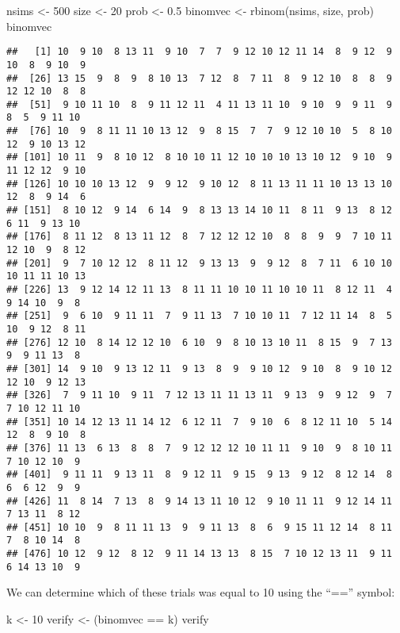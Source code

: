\documentclass[
]{book}
\newenvironment{Shaded}{\begin{snugshade}}{\end{snugshade}}
\newcommand{\DecValTok}[1]{\textcolor[rgb]{0.00,0.00,0.81}{#1}}
\newcommand{\FloatTok}[1]{\textcolor[rgb]{0.00,0.00,0.81}{#1}}
\newcommand{\FunctionTok}[1]{\textcolor[rgb]{0.00,0.00,0.00}{#1}}
\newcommand{\NormalTok}[1]{#1}
\newcommand{\OtherTok}[1]{\textcolor[rgb]{0.56,0.35,0.01}{#1}}
\newcommand{\SpecialCharTok}[1]{\textcolor[rgb]{0.00,0.00,0.00}{#1}}
\begin{document}
\begin{Shaded}
\begin{Highlighting}[]
\NormalTok{nsims }\OtherTok{\textless{}{-}} \DecValTok{500}
\NormalTok{size }\OtherTok{\textless{}{-}} \DecValTok{20}
\NormalTok{prob }\OtherTok{\textless{}{-}} \FloatTok{0.5}
\NormalTok{binomvec }\OtherTok{\textless{}{-}} \FunctionTok{rbinom}\NormalTok{(nsims, size, prob)}
\NormalTok{binomvec}
\end{Highlighting}
\end{Shaded}

\begin{verbatim}
##   [1] 10  9 10  8 13 11  9 10  7  7  9 12 10 12 11 14  8  9 12  9 10  8  9 10  9
##  [26] 13 15  9  8  9  8 10 13  7 12  8  7 11  8  9 12 10  8  8  9 12 12 10  8  8
##  [51]  9 10 11 10  8  9 11 12 11  4 11 13 11 10  9 10  9  9 11  9  8  5  9 11 10
##  [76] 10  9  8 11 11 10 13 12  9  8 15  7  7  9 12 10 10  5  8 10 12  9 10 13 12
## [101] 10 11  9  8 10 12  8 10 10 11 12 10 10 10 13 10 12  9 10  9 11 12 12  9 10
## [126] 10 10 10 13 12  9  9 12  9 10 12  8 11 13 11 11 10 13 13 10 12  8  9 14  6
## [151]  8 10 12  9 14  6 14  9  8 13 13 14 10 11  8 11  9 13  8 12  6 11  9 13 10
## [176]  8 11 12  8 13 11 12  8  7 12 12 12 10  8  8  9  9  7 10 11 12 10  9  8 12
## [201]  9  7 10 12 12  8 11 12  9 13 13  9  9 12  8  7 11  6 10 10 10 11 11 10 13
## [226] 13  9 12 14 12 11 13  8 11 11 10 10 11 10 10 11  8 12 11  4  9 14 10  9  8
## [251]  9  6 10  9 11 11  7  9 11 13  7 10 10 11  7 12 11 14  8  5 10  9 12  8 11
## [276] 12 10  8 14 12 12 10  6 10  9  8 10 13 10 11  8 15  9  7 13  9  9 11 13  8
## [301] 14  9 10  9 13 12 11  9 13  8  9  9 10 12  9 10  8  9 10 12 12 10  9 12 13
## [326]  7  9 11 10  9 11  7 12 13 11 11 13 11  9 13  9  9 12  9  7  7 10 12 11 10
## [351] 10 14 12 13 11 14 12  6 12 11  7  9 10  6  8 12 11 10  5 14 12  8  9 10  8
## [376] 11 13  6 13  8  8  7  9 12 12 12 10 11 11  9 10  9  8 10 11  7 10 12 10  9
## [401]  9 11 11  9 13 11  8  9 12 11  9 15  9 13  9 12  8 12 14  8  6  6 12  9  9
## [426] 11  8 14  7 13  8  9 14 13 11 10 12  9 10 11 11  9 12 14 11  7 13 11  8 12
## [451] 10 10  9  8 11 11 13  9  9 11 13  8  6  9 15 11 12 14  8 11  7  8 10 14  8
## [476] 10 12  9 12  8 12  9 11 14 13 13  8 15  7 10 12 13 11  9 11  6 14 13 10  9
\end{verbatim}

We can determine which of these trials was equal to 10 using the ``=='' symbol:

\begin{Shaded}
\begin{Highlighting}[]
\NormalTok{k }\OtherTok{\textless{}{-}} \DecValTok{10}
\NormalTok{verify }\OtherTok{\textless{}{-}}\NormalTok{ (binomvec }\SpecialCharTok{==}\NormalTok{ k)}
\NormalTok{verify}
\end{Highlighting}
\end{Shaded}
\end{document}

